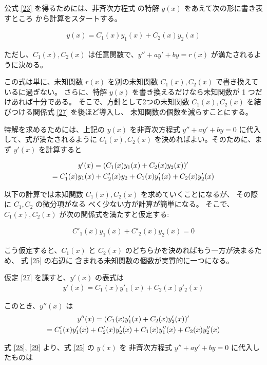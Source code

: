 公式 \eqref{23} を得るためには、非斉次方程式 の特解
 $y(x)$ をあえて次の形に書き表すところ
から計算をスタートする。

\begin{gather}
  y(x) = C_1(x)y_1(x) + C_2(x)y_2(x) \label{25}
\end{gather}

ただし、$C_1(x), C_2(x)$ は任意関数で、$y'' + ay' + by=r(x)$ が満たされるように決める。

この式は単に、未知関数 $r(x)$ を別の未知関数 $C_1(x), C_2(x)$ で書き換えているに過ぎない。
さらに、特解 $y(x)$ を書き換えるだけなら未知関数が 1 つだけあれば十分である。
そこで、方針として2つの未知関数 $C_1(x), C_2(x)$ を結びつける関係式 \eqref{27} を後ほど導入し、
未知関数の個数を減らすことにする。

特解を求めるためには、上記の $y(x)$ を非斉次方程式 $y'' + ay' + by=0$ に代入して、式が満たされるように
$C_1(x), C_2(x)$ を決めればよい。そのために、まず $y'(x)$ を計算すると

\begin{gather}
  y'(x)
  = (C_1(x)y_1(x) + C_2(x)y_2(x))'  \notag\\
  = C'_1(x)y_1(x) + C'_2(x)y_2 + C_1(x)y'_1(x) + C_2(x)y'_2(x) \label{26}
\end{gather}

以下の計算では未知関数 $C_1(x), C_2(x)$ を求めていくことになるが、
その際に $C_1, C_2$ の微分項がなる
べく少ない方が計算が簡単になる。
そこで、$C_1(x), C_2(x)$ が次の関係式を満たすと仮定する:

\begin{gather}
  C'_1(x)y_1(x) + C'_2(x)y_2(x) = 0 \label{27}
\end{gather}


こう仮定すると、$C_1(x)$ と $C_2(x)$ のどちらかを決めればもう一方が決まるため、
式 \eqref{25} の右辺に
含まれる未知関数の個数が実質的に一つになる。

仮定 \eqref{27} を課すと、$y'(x)$ の表式は
\begin{gather}
  y'(x) = C_1(x)y'_1(x) + C_2(x)y'_2(x) \label{28}
\end{gather}

このとき、$y''(x)$ は
\begin{gather}
  y''(x)
  = (C_1(x)y'_1(x) + C_2(x)y'_2(x))' \notag\\
  = C'_1(x)y'_1(x) + C'_2(x)y'_2(x) + C_1(x)y''_1(x) + C_2(x)y''_2(x) \label{29}
\end{gather}

式 \eqref{28}, \eqref{29} より、式 \eqref{25} の $y(x)$ を
非斉次方程式 $y'' + ay' + by=0$ に代入したものは

